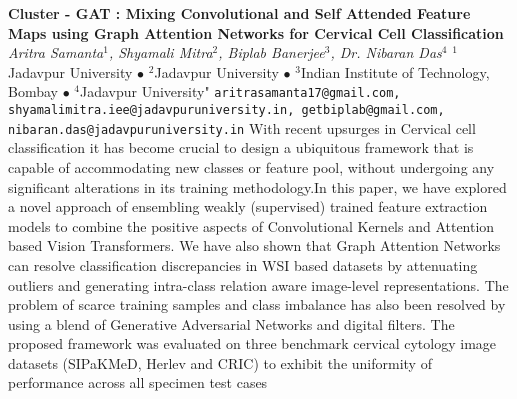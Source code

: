 
    \begin{conf-abstract}[]
        {\textbf{Cluster - GAT : Mixing Convolutional and Self Attended Feature Maps using Graph Attention Networks for Cervical Cell Classification}}
        {\textit{Aritra Samanta$^{1}$, Shyamali Mitra$^{2}$, Biplab Banerjee$^{3}$, Dr. Nibaran Das$^{4}$}}
        {$^{1}$Jadavpur University $\bullet$ $^{2}$Jadavpur University $\bullet$ $^{3}$Indian Institute of Technology, Bombay $\bullet$ $^{4}$Jadavpur University"}
        {\texttt{aritrasamanta17@gmail.com, shyamalimitra.iee@jadavpuruniversity.in, getbiplab@gmail.com, nibaran.das@jadavpuruniversity.in}}
        {With recent upsurges in Cervical cell classification   it has become crucial to design a ubiquitous framework that is capable of accommodating new classes or feature pool, without undergoing any significant alterations in its training methodology.In this paper, we have explored a novel approach of ensembling weakly (supervised) trained feature extraction models to combine the positive aspects of Convolutional Kernels and Attention based Vision Transformers. We have also shown that Graph Attention Networks can resolve classification discrepancies in WSI based datasets by attenuating outliers and generating intra-class relation aware image-level representations. The problem of scarce training samples and class imbalance has also been resolved by using a blend of Generative Adversarial Networks and digital filters. The proposed framework was evaluated on three benchmark cervical cytology image datasets (SIPaKMeD, Herlev and CRIC) to exhibit the uniformity of performance across all specimen test cases}
    \end{conf-abstract}
        